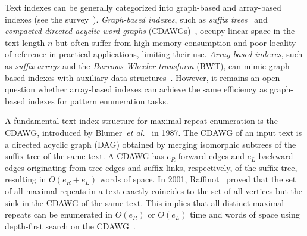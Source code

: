 Text indexes can be generally categorized into graph-based and array-based indexes (see the survey~\cite{navarro2021indexing:ii}). \textit{Graph-based indexes}, such as \textit{suffix trees}~\cite{weiner1973linear} and \textit{compacted directed acyclic word graphs} (CDAWGs)~\cite{blumer1987complete}, occupy linear space in the text length $n$ but often suffer from high memory consumption and poor locality of reference in practical applications, limiting their use. 
\textit{Array-based indexes}, such as \textit{suffix arrays} and the \textit{Burrows-Wheeler transform} (BWT), can mimic graph-based indexes with auxiliary data structures~\cite{navarro2016cds:book}. However, it remains an open question whether array-based indexes can achieve the same efficiency as graph-based indexes for pattern enumeration tasks.


A fundamental text index structure for maximal repeat enumeration is the CDAWG, introduced by Blumer~\textit{et al.}~\cite{blumer1987complete} in 1987. The CDAWG of an input text is a directed acyclic graph (DAG) obtained by merging isomorphic subtrees of the suffix tree of the same text. A CDAWG has $e_R$ forward edges and $e_L$ backward edges 
originating from tree edges and suffix links, respectively,
of the suffix tree, resulting in $O(e_R + e_L)$ words of space. 
In 2001, Raffinot~\cite{raffinot2001maximal} proved that the set of all maximal repeats in a text exactly coincides to the set of all vertices but the sink in the CDAWG of the same text.
This implies that all distinct maximal repeats can be enumerated in $O(e_R)$ or $O(e_L)$ time and words of space using depth-first search on the CDAWG~\cite{raffinot2001maximal}.

